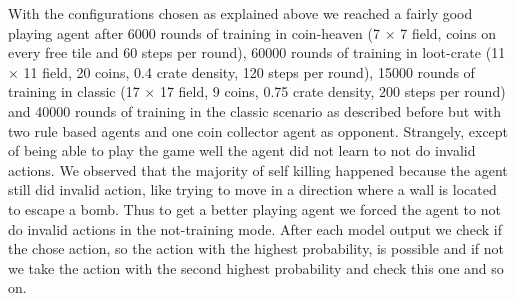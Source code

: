 With the configurations chosen as explained above we reached a fairly good playing agent after 6000 rounds of training in coin-heaven (7 $\times$ 7 field, coins on every free tile and 60 steps per round), 60000 rounds of training in loot-crate (11 $\times$ 11 field, 20 coins, 0.4 crate density, 120 steps per round), 15000 rounds of training in classic (17 $\times$ 17 field, 9 coins, 0.75 crate density, 200 steps per round) and 40000 rounds of training in the classic scenario as described before but with two rule based agents and one coin collector agent as opponent. Strangely, except of being able to play the game well the agent did not learn to not do invalid actions. We observed that the majority of self killing happened because the agent still did invalid action, like trying to move in a direction where a wall is located to escape a bomb. Thus to get a better playing agent we forced the agent to not do invalid actions in the not-training mode. After each model output we check if the chose action, so the action with the highest probability, is possible and if not we take the action with the second highest probability and check this one and so on. 

